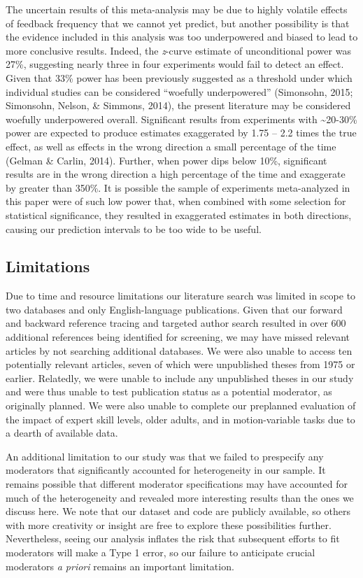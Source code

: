 \documentclass[
  english,
  man, donotrepeattitle,floatsintext]{apa7}
\begin{document}
The uncertain results of this meta-analysis may be due to highly volatile effects of feedback frequency that we cannot yet predict, but another possibility is that the evidence included in this analysis was too underpowered and biased to lead to more conclusive results. Indeed, the \emph{z}-curve estimate of unconditional power was 27\%, suggesting nearly three in four experiments would fail to detect an effect. Given that 33\% power has been previously suggested as a threshold under which individual studies can be considered ``woefully underpowered'' (Simonsohn, 2015; Simonsohn, Nelson, \& Simmons, 2014), the present literature may be considered woefully underpowered overall. Significant results from experiments with \textasciitilde20-30\% power are expected to produce estimates exaggerated by 1.75 -- 2.2 times the true effect, as well as effects in the wrong direction a small percentage of the time (Gelman \& Carlin, 2014). Further, when power dips below 10\%, significant results are in the wrong direction a high percentage of the time and exaggerate by greater than 350\%. It is possible the sample of experiments meta-analyzed in this paper were of such low power that, when combined with some selection for statistical significance, they resulted in exaggerated estimates in both directions, causing our prediction intervals to be too wide to be useful.

\hypertarget{limitations}{%
\subsection{Limitations}\label{limitations}}

Due to time and resource limitations our literature search was limited in scope to two databases and only English-language publications. Given that our forward and backward reference tracing and targeted author search resulted in over 600 additional references being identified for screening, we may have missed relevant articles by not searching additional databases. We were also unable to access ten potentially relevant articles, seven of which were unpublished theses from 1975 or earlier. Relatedly, we were unable to include any unpublished theses in our study and were thus unable to test publication status as a potential moderator, as originally planned. We were also unable to complete our preplanned evaluation of the impact of expert skill levels, older adults, and in motion-variable tasks due to a dearth of available data.

An additional limitation to our study was that we failed to prespecify any moderators that significantly accounted for heterogeneity in our sample. It remains possible that different moderator specifications may have accounted for much of the heterogeneity and revealed more interesting results than the ones we discuss here. We note that our dataset and code are publicly available, so others with more creativity or insight are free to explore these possibilities further. Nevertheless, seeing our analysis inflates the risk that subsequent efforts to fit moderators will make a Type 1 error, so our failure to anticipate crucial moderators \emph{a priori} remains an important limitation.
\end{document}
